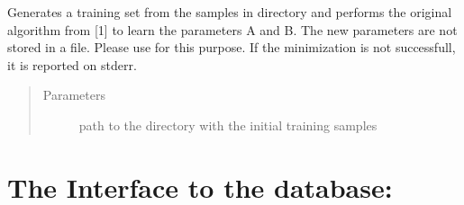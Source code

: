 \documentclass[letterpaper,10pt,english]{sphinxmanual}
\begin{document}
\begin{fulllineitems}
\begin{fulllineitems}
Generates a training set from the samples in directory and
performs the original algorithm from {[}1{]} to learn the
parameters A and B. The new parameters are not stored in a
file. Please use {\hyperref[\detokenize{api:probability.Probability.store_to_file}]{}} for this purpose. If the
minimization is not successfull, it is reported on stderr.
\begin{quote}\begin{description}
\item[{Parameters}] \leavevmode
{} \textendash{} path to the directory with the initial training
samples

\end{description}\end{quote}

\end{fulllineitems}


\end{fulllineitems}



\section{The Interface to the database:}
\label{\detokenize{api:module-db_interface}}\label{\detokenize{api:the-interface-to-the-database}}
\end{document}
